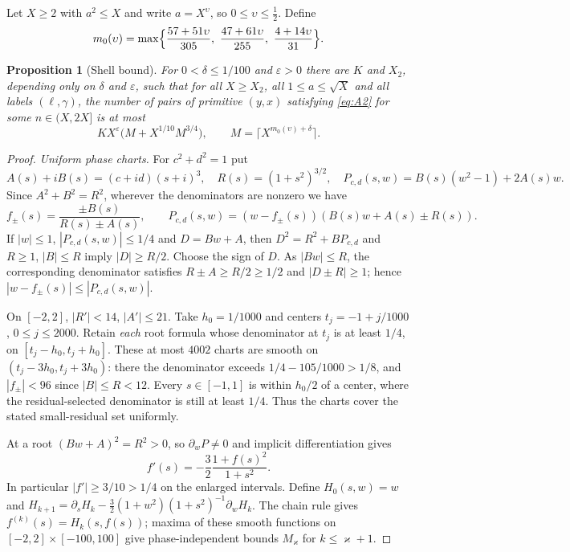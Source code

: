\documentclass[11pt,reqno]{amsart}
\newtheorem{proposition}[theorem]{Proposition}
\theoremstyle{definition}
\theoremstyle{remark}
\numberwithin{equation}{section}
\newcommand{\eps}{\varepsilon}\newcommand{\card}{\#}
\begin{document}
Let $X\ge2$ with $a^2\le X$ and write $a=X^{\upsilon}$, so
$0\le\upsilon\le\frac12$. Define
\begin{equation}\label{eq:m0}
 m_0(\upsilon)=\max\Bigl\{\frac{57+51\upsilon}{305},\
 \frac{47+61\upsilon}{255},\ \frac{4+14\upsilon}{31}\Bigr\}.
\end{equation}
\begin{proposition}[Shell bound]\label{prop:A2shell}
For $0<\delta\le1/100$ and $\eps>0$ there are
$K$ and $X_2$, depending only on $\delta$ and $\eps$, such that for all
$X\ge X_2$, all $1\le a\le\sqrt X$ and all labels $(\ell,\gamma)$, the number
of pairs of primitive $(y,x)$ satisfying \eqref{eq:A2} for some
$n\in(X,2X]$ is at most
\[
 KX^{\eps}\bigl(M+X^{1/10}M^{3/4}\bigr),\qquad
 M=\lceil X^{m_0(\upsilon)+\delta}\rceil .
\]
\end{proposition}
\begin{proof}
\emph{Uniform phase charts.}
For $c^2+d^2=1$ put
\[
 A(s)+iB(s)=(c+id)(s+i)^3,\quad R(s)=(1+s^2)^{3/2},\quad
 P_{c,d}(s,w)=B(s)(w^2-1)+2A(s)w.
\]
Since $A^2+B^2=R^2$, wherever the denominators are nonzero we have
\[
 f_\pm(s)=\frac{\pm B(s)}{R(s)\pm A(s)},\qquad
 P_{c,d}(s,w)=(w-f_\pm(s))(B(s)w+A(s)\pm R(s)).
\]
If $|w|\le1$, $|P_{c,d}(s,w)|\le1/4$ and $D=Bw+A$, then
$D^2=R^2+BP_{c,d}$ and $R\ge1$, $|B|\le R$ imply $|D|\ge R/2$.
Choose the sign of $D$. As $|Bw|\le R$, the corresponding
denominator satisfies $R\pm A\ge R/2\ge1/2$ and
$|D\pm R|\ge1$; hence $|w-f_\pm(s)|\le|P_{c,d}(s,w)|$.

On $[-2,2]$, $|R'|<14$, $|A'|\le21$. Take $h_0=1/1000$ and
centers $t_j=-1+j/1000$, $0\le j\le2000$. Retain \emph{each}
root formula whose denominator at $t_j$ is at least $1/4$, on
$[t_j-h_0,t_j+h_0]$. These at most $4002$ charts are smooth on
$(t_j-3h_0,t_j+3h_0)$: there the denominator exceeds
$1/4-105/1000>1/8$, and $|f_\pm|<96$ since $|B|\le R<12$.
Every $s\in[-1,1]$ is within $h_0/2$ of a center, where the
residual-selected denominator is still at least $1/4$.
Thus the charts cover the stated small-residual set uniformly.

At a root $(Bw+A)^2=R^2>0$, so $\partial_wP\ne0$ and
implicit differentiation gives
\begin{equation}\label{eq:A2phaseode}
 f'(s)=-\frac32\frac{1+f(s)^2}{1+s^2}.
\end{equation}
In particular $|f'|\ge3/10>1/4$ on the enlarged intervals.
Define $H_0(s,w)=w$ and
$H_{k+1}=\partial_sH_k-\frac32(1+w^2)(1+s^2)^{-1}\partial_wH_k$.
The chain rule gives $f^{(k)}(s)=H_k(s,f(s))$; maxima of these
smooth functions on $[-2,2]\times[-100,100]$ give phase-independent
bounds $M_\varkappa$ for $k\le\varkappa+1$.


\end{proof}
\end{document}
